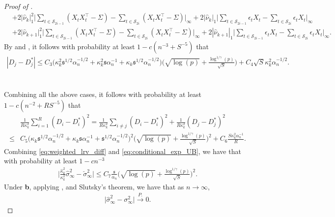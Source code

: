 \documentclass[11pt]{article}
\newcommand{\s}{ { \mathfrak{s}  } }
\theoremstyle{plain}
\theoremstyle{definition}
\begin{document}
\begin{proof}[Proof of ]
\begin{align*}
    &+ 2\big|\widehat{ \nu}_k\big|_1^2\bigg|\sum_{t \in \mathcal{S}_{2i-1}}(X_tX_t^{\top} - \Sigma) - \sum_{t \in \mathcal{S}_{2i}}(X_tX_t^{\top} - \Sigma)\bigg|_{\infty} + 2|\widehat{ \nu}_{k}|_1\bigg|\sum_{t \in \mathcal{S}_{2i-1}}\epsilon_tX_t - \sum_{t \in \mathcal{S}_{2i}}\epsilon_tX_t\bigg|_{\infty}\\
    & + 2\big|\widehat{ \nu}_{k+1}\big|_1^2\bigg|\sum_{t \in \mathcal{S}_{2i-1}}(X_tX_t^{\top} - \Sigma) - \sum_{t \in \mathcal{S}_{2i}}(X_tX_t^{\top} - \Sigma)\bigg|_{\infty} + 2|\widehat{ \nu}_{k+1}|_1\bigg|\sum_{t \in \mathcal{S}_{2i-1}}\epsilon_tX_t - \sum_{t \in \mathcal{S}_{2i}}\epsilon_tX_t\bigg|_{\infty}.
\end{align*}
By  and , it follows with probability at least $1 - c(n^{-3} + S^{-5})$ that
\begin{align*}
    |D_j - D_j^*| \leq C_3\big(\kappa_k^2\s^{1/2}\alpha_n^{-1/2} + \kappa_k^2\s\alpha_n^{-1} + \kappa_k\s^{1/2}\alpha_n^{-1/2}\big)\bigg( \sqrt{\log(p)} + \frac{\log^{1/\gamma}(p)}{\sqrt{S}} \bigg) + C_4\sqrt{S}\kappa_k^2\alpha_n^{-1/2}.
\end{align*}
\\
\\
Combining all the above cases, it follows with probability at least $1 - c(n^{-2} + RS^{-5})$ that
\begin{align}\label{eq:conditional_exp_UB}
    &\frac{1}{R\kappa_k^2}\sum_{i = 1}^R(D_i - D_i^*)^2 = \frac{1}{R\kappa_k^2}\sum_{i \neq j}(D_i - D_i^*)^2 + \frac{1}{R\kappa_k^2}(D_j - D_j^*)^2\nonumber\\
    \leq& C_5\big(\kappa_k\s^{1/2}\alpha_n^{-1/2} + \kappa_k\s\alpha_n^{-1} + \s^{1/2}\alpha_n^{-1/2}\big)^2\bigg( \sqrt{\log(p)} + \frac{\log^{1/\gamma}(p)}{\sqrt{S}} \bigg)^2 + C_6\frac{S\kappa_k^2\alpha_n^{-1}}{R}.
\end{align}
Combining \eqref{eq:weighted_lrv_diff} and \eqref{eq:conditional_exp_UB}, we have that with probability at least $1 - cn^{-3}$
\begin{align*}
    \bigg|\frac{\widehat{\kappa}_k^2}{\kappa_k^2}\widehat{\sigma}_{\infty}^2 - \check{\sigma}_{\infty}^2\bigg| \leq C_7\frac{\s}{\alpha_n}\bigg( \sqrt{\log(p)} + \frac{\log^{1/\gamma}(p)}{\sqrt{S}} \bigg)^2.
\end{align*}
Under \textbf{b}, applying ,  and Slutsky's theorem, we have that as $n \to \infty$,
\begin{align*}
    \big|\widehat{\sigma}_{\infty}^2 - \sigma_{\infty}^2\big| \overset{P.}{\longrightarrow} 0.
\end{align*}
\end{proof}
\end{document}
